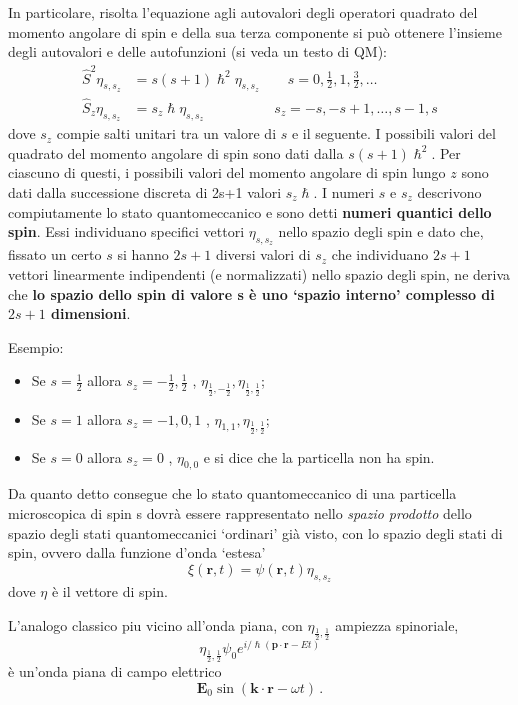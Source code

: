 In particolare, risolta l'equazione agli autovalori degli operatori
quadrato del momento angolare di spin e della sua terza componente si
può ottenere l'insieme degli autovalori e delle autofunzioni (si veda un testo di QM):
\begin{align*}
    \hat{S}^{2} \eta_{s,s_{z}} &= s (s+1) \hslash^{2} \eta_{s,s_{z}} \qquad s = 0, \frac{1}{2}, 1, \frac{3}{2}, \dots\\
    \hat{S}_{z} \eta_{s,s_{z}} &= s_{z} \hslash \eta_{s,s_{z}} \qquad \qquad \quad s_{z} = -s, -s+1, \dots , s-1, s
\end{align*} dove \(s_{z}\) compie salti unitari tra un valore di \(s\) e il
seguente.
I possibili valori del quadrato del momento angolare di spin
sono dati dalla \(s(s+1)\hslash^{2}\).
Per ciascuno di questi, i
possibili valori del momento angolare di spin lungo \(z\) sono dati
dalla successione discreta di 2s+1 valori \(s_{z} \hslash\).
I
numeri \(s\) e \(s_{z}\) descrivono compiutamente lo stato
quantomeccanico e sono detti \textbf{numeri quantici dello spin}.
Essi
individuano specifici vettori \(\eta_{s,s_{z}}\) nello spazio degli spin
e dato che, fissato un certo \(s\) si hanno \(2s+1\) diversi valori di
\(s_{z}\) che individuano \(2s+1\) vettori linearmente indipendenti (e
normalizzati) nello spazio degli spin, ne deriva che \textbf{lo spazio
dello spin di valore s è uno `spazio interno' complesso di \(2s+1\)
    dimensioni}.

Esempio:
\begin{itemize}
    \item Se \(s = \frac{1}{2}\) allora
    \(s_{z} = - \frac{1}{2} , \frac{1}{2}\) ,
    \(\eta_{\frac{1}{2},- \frac{1}{2}}, \eta_{\frac{1}{2}, \frac{1}{2}}\);
    \item Se \(s = 1\) allora \(s_{z} = -1,0,1\) ,
    \(\eta_{1,1},\eta_{\frac{1}{2}, \frac{1}{2}}\);
    \item Se \(s = 0\) allora
    \(s_{z} = 0\) , \(\eta_{0,0}\) e si dice che la particella non ha spin.
\end{itemize}
Da quanto detto consegue che lo stato quantomeccanico di una particella
microscopica di spin s dovrà essere rappresentato nello \emph{spazio
prodotto} dello spazio degli stati quantomeccanici `ordinari' già visto,
con lo spazio degli stati di spin, ovvero dalla funzione d'onda `estesa'
\[
    \xi(\bm{r},t) =   \psi(\bm{r},t) \eta_{s,s_{z}}
\] dove \(\eta\) è il vettore di spin.

\begin{marginfigure}
    L'analogo classico piu vicino all'onda piana, con
    \(\eta_{\frac{1}{2}, \frac{1}{2}}\) ampiezza spinoriale,
    \[
        \eta_{\frac{1}{2}, \frac{1}{2}} \psi_{0}e^{ i/\hslash (\bm{p}\cdot \bm{r} - Et)}
    \] è un'onda piana di campo elettrico
    \[
        \bm{E}_{0} \sin(\bm{k}\cdot \bm{r} - \omega t) \, .
    \]
\end{marginfigure}



